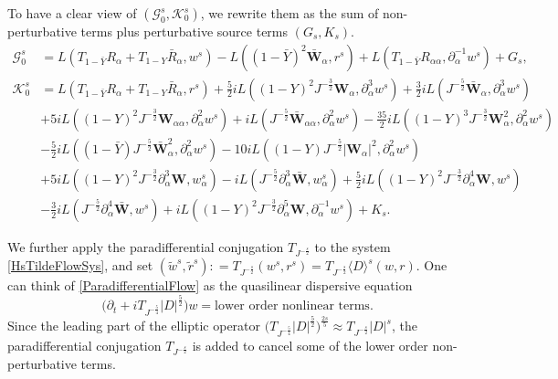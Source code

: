 \documentclass[10pt]{amsart}
\theoremstyle{remark}
\theoremstyle{definition}
\numberwithin{equation}{section}
\newcommand{\p}{\partial}
\newcommand{\al}{\alpha}
\newcommand{\f}{\frac}
\newcommand{\bw}{\mathbf{W}}
\begin{document}
To have a clear view of $(\mathcal{G}^s_0, \mathcal{K}^s_0)$, we rewrite them as the sum of non-perturbative terms plus perturbative source terms $(G_s, K_s)$.
\begin{align*}
\mathcal{G}^s_0 &= L(T_{1-\bar{Y}}R_\alpha +T_{1-Y}\bar{R}_\alpha, w^s)-L((1-\bar{Y})^2\bar{\bw}_\alpha, r^s)+ L(T_{1-\bar{Y}}R_{\alpha \alpha}, \partial_\alpha^{-1}w^s)+G_s ,\\
 \mathcal{K}^s_0 &= L(T_{1-\bar{Y}}R_\alpha +T_{1-Y}\bar{R}_\alpha, r^s) +\f52iL( (1-Y)^2J^{-\f32} \bw_\al, \p_\al^3 w^s) +\f32iL(J^{-\f52} \bar{\bw}_\al, \p_\al^3 w^s)\\
 & +5iL((1-Y)^2J^{-\f32}\bw_{\al\al}, \p_\al^2 w^s) +iL(J^{-\f52}\bar{\bw}_{\al\al}, \p_\al^2 w^s)- \f{35}{2}iL((1-Y)^3J^{-\f32}\bw_{\al}^2, \p_\al^2 w^s) \\
 &-\f52iL((1-\bar{Y})J^{-\f52}\bar{\bw}_{\al}^2, \p_\al^2 w^s)- 10iL((1-Y)J^{-\f52}|\bw_{\al}|^2, \p_\al^2 w^s) \\
 &+5iL((1-Y)^2J^{-\f32}\p_\al^3\bw,  w^s_\al)- iL(J^{-\f52}\p_\al^3\bar{\bw}, w^s_\al)  + \f52i L((1-Y)^2J^{-\f32}\p_\al^4\bw,  w^s) \\
 &-\f32iL(J^{-\f52}\p_\al^4 \bar{\bw}, w^s) + iL((1-Y)^2J^{-\f32}\p_\al^5\bw,  \p_\al^{-1}w^s)+K_s.
\end{align*}

We further apply the paradifferential conjugation  $T_{J^{-\f{s}{2}}}$ to the system \eqref{HsTildeFlowSys}, and set $(\tilde{w}^s, \tilde{r}^s):  = T_{J^{-\f{s}{2}}}(w^s,r^s) = T_{J^{-\f{s}{2}}}\langle D\rangle^s(w,r)$.
One can think of \eqref{ParadifferentialFlow} as the quasilinear dispersive equation
\begin{equation*}
    \Big(\p_t + i T_{J^{-\f54}}|D|^\f52 \Big)w = \text{lower order nonlinear terms}. 
\end{equation*}
Since the leading part of the elliptic operator $\Big(T_{J^{-\f54}}|D|^\f52 \Big)^{\f{2s}{5}} \approx T_{J^{-\f{s}{2}}}|D|^s$,  the paradifferential conjugation $T_{J^{-\f{s}{2}}}$ is added to cancel some of the lower order non-perturbative terms.
\end{document}
